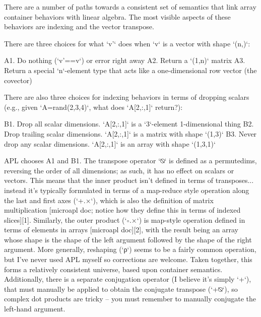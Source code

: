 There are a number of paths towards a consistent set of semantics that link
array container behaviors with linear algebra. The most visible aspects of
these behaviors are indexing and the vector transpose.


There are three choices for what `v'` does when `v` is a vector with shape `(n,)`:

A1. Do nothing (`v'==v`) or error right away
A2. Return a `(1,n)` matrix
A3. Return a special `n`-element type that acts like a one-dimensional row vector (the covector)


There are also three choices for indexing behaviors in terms of dropping
scalars (e.g., given `A=rand(2,3,4)`, what does `A[2,:,1]` return?):

B1. Drop all scalar dimensions. `A[2,:,1]` is a `3`-element 1-dimensional thing
B2. Drop trailing scalar dimensions. `A[2,:,1]` is a matrix with shape `(1,3)`
B3. Never drop any scalar dimensions. `A[2,:,1]` is an array with shape `(1,3,1)`

APL chooses A1 and B1. The transpose operator `⍉` is defined as a permutedims,
reversing the order of all dimensions; as such, it has no effect on scalars or
vectors. This means that the inner product isn't defined in terms of
transposes... instead it's typically formulated in terms of a map-reduce style
operation along the last and first axes (`+.×`), which is also the definition
of matrix multiplication [microapl doc; notice how they define this in terms of
indexed slices][1]. Similarly, the outer product (`∘.×`) is map-style operation
defined in terms of elements in arrays [microapl doc][2], with the result being
an array whose shape is the shape of the left argument followed by the shape of
the right argument. More generally, reshaping (`ρ`) seems to be a fairly common
operation, but I've never used APL myself so corrections are welcome. Taken
together, this forms a relatively consistent universe, based upon container
semantics. Additionally, there is a separate conjugation operator (I believe
it's simply `+`), that must manually be applied to obtain the conjugate
transpose (`+⍉`), so complex dot products are tricky -- you must remember to
manually conjugate the left-hand argument.

